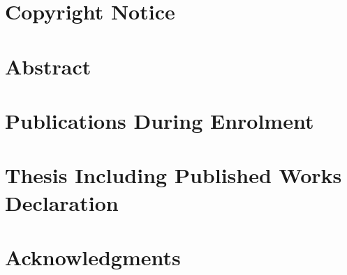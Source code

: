 \newpage


\chapter*{Copyright Notice}


\chapter*{Abstract}


\chapter*{Publications During Enrolment}


\chapter*{Thesis Including Published Works Declaration}



\chapter*{Acknowledgments}


\setcounter{secnumdepth}{2}
\setcounter{tocdepth}{1}

\tableofcontents %

\listoffigures %

\listoftables %




